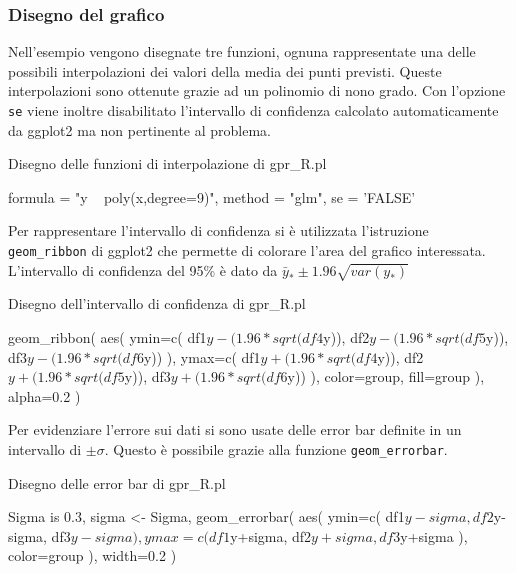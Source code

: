 \documentclass[10pt,titlepage,twoside,a4paper]{report}
\newenvironment{code}{\singlespacing\captionsetup{type=listing}}{}
\begin{document}
\subsubsection{Disegno del grafico}

Nell'esempio vengono disegnate tre funzioni, ognuna rappresentate una 
delle possibili interpolazioni dei valori della media dei punti previsti.
Queste interpolazioni sono ottenute grazie ad un polinomio di nono grado.
Con l'opzione \texttt{se} viene inoltre disabilitato l'intervallo di 
confidenza calcolato automaticamente da ggplot2 ma non pertinente al problema.

\begin{code}
\caption{Disegno delle funzioni di interpolazione di gpr\_R.pl}
\begin{rcode*}{}
formula = "y ~ poly(x,degree=9)",
method = "glm",
se = 'FALSE'
\end{rcode*}
\end{code}

Per rappresentare l'intervallo di confidenza si è utilizzata l'istruzione
\texttt{geom\_ribbon} di ggplot2 che permette di colorare l'area del grafico 
interessata. L'intervallo di confidenza del 95\% è dato da $\bar{y}_{\ast} \pm 
1.96\sqrt{var(y_{\ast})}$ 

\begin{code}
\caption{Disegno dell'intervallo di confidenza di gpr\_R.pl}
\begin{rcode*}{}
geom_ribbon(
    aes(
        ymin=c(
            df1$y-(1.96*sqrt(df4$y)),
            df2$y-(1.96*sqrt(df5$y)),
            df3$y-(1.96*sqrt(df6$y))
        ),
        ymax=c(
            df1$y+(1.96*sqrt(df4$y)),
            df2$y+(1.96*sqrt(df5$y)),
            df3$y+(1.96*sqrt(df6$y))
        ),
        color=group,
        fill=group
    ),
    alpha=0.2
)
\end{rcode*}
\end{code}

Per evidenziare l'errore sui dati si sono usate delle error bar definite in un 
intervallo di $\pm \sigma$. Questo è possibile grazie alla funzione 
\texttt{geom\_errorbar}.

\begin{code}
\caption{Disegno delle error bar di gpr\_R.pl}
\begin{rcode*}{}
Sigma is 0.3,
sigma <- Sigma,
geom_errorbar(
    aes(
        ymin=c(
            df1$y-sigma,
            df2$y-sigma,
            df3$y-sigma
        ),
        ymax=c(
            df1$y+sigma,
            df2$y+sigma,
            df3$y+sigma
        ),
        color=group
    ),
    width=0.2
)
\end{rcode*}
\end{code}
\end{document}

